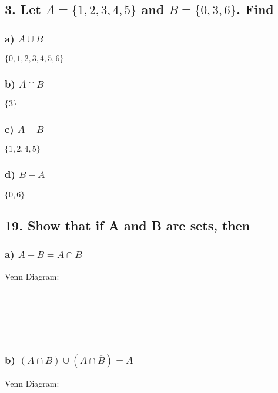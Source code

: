 \documentclass[11pt, oneside]{article} %
\numberwithin{equation}{section} %
\numberwithin{figure}{section} %
\numberwithin{table}{section} %
\begin{document}
\subsection{3. Let $A = \{1,2,3,4,5\}$ and $B = \{0,3,6\}$. Find}
\subsubsection{a) $A\cup B$}
$\{0,1,2,3,4,5,6 \}$
\subsubsection{b) $A\cap B$}
$\{3\}$
\subsubsection{c) $A-B$}
$\{1,2,4,5\}$
\subsubsection{d) $B-A$}
$\{0,6\}$

\subsection{19. Show that if A and B are sets, then}
\subsubsection{a) $A-B=A\cap \overline{B}$}
Venn Diagram: \\\\\\\\\\\
\subsubsection{b) $(A\cap B)\cup (A\cap \overline{B})=A$}
Venn Diagram: \\\\\\\\\\\
\end{document}
